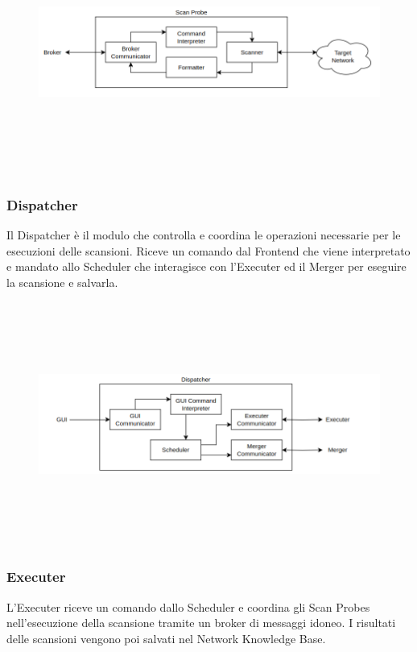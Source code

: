 \documentclass[target=bach,aauheader=,style=]{thud}
\begin{document}
\begin{figure}[h]
  \includegraphics[width=14cm, height=8cm]{probe}
  \centering
\end{figure}
\FloatBarrier


\subsubsection{Dispatcher} 
Il Dispatcher è il modulo che controlla e coordina le operazioni necessarie per le esecuzioni delle scansioni.
Riceve un comando dal Frontend che viene interpretato e mandato allo Scheduler che interagisce con l'Executer ed il Merger per eseguire la scansione e salvarla.

\begin{figure}[h]
  \includegraphics[width=14cm, height=8cm]{dispatcher}
  \centering
\end{figure}

\FloatBarrier

\subsubsection{Executer} 
L'Executer riceve un comando dallo Scheduler e coordina gli Scan Probes nell'esecuzione della scansione tramite un broker di messaggi idoneo. I risultati delle scansioni vengono poi salvati nel Network Knowledge Base.
\end{document}
